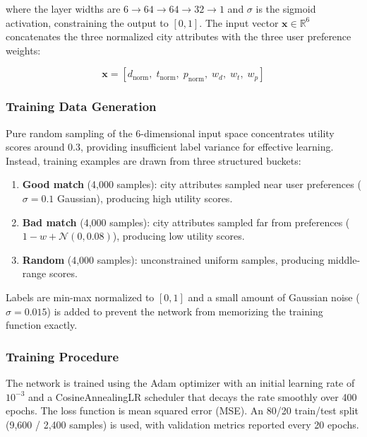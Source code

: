 \documentclass[12pt]{article}
\begin{document}
where the layer widths are $6 \to 64 \to 64 \to 32 \to 1$ and $\sigma$ is the sigmoid activation, constraining the output to $[0, 1]$. The input vector $\mathbf{x} \in \mathbb{R}^6$ concatenates the three normalized city attributes with the three user preference weights:

\begin{equation}
    \mathbf{x} = [d_{\text{norm}},\; t_{\text{norm}},\; p_{\text{norm}},\; w_d,\; w_t,\; w_p]
\end{equation}

\subsubsection{Training Data Generation}

Pure random sampling of the 6-dimensional input space concentrates utility scores around 0.3, providing insufficient label variance for effective learning. Instead, training examples are drawn from three structured buckets:

\begin{enumerate}[(1)]
    \item \textbf{Good match} (4,000 samples): city attributes sampled near user preferences ($\sigma = 0.1$ Gaussian), producing high utility scores.
    \item \textbf{Bad match} (4,000 samples): city attributes sampled far from preferences ($1 - w + \mathcal{N}(0, 0.08)$), producing low utility scores.
    \item \textbf{Random} (4,000 samples): unconstrained uniform samples, producing middle-range scores.
\end{enumerate}

Labels are min-max normalized to $[0, 1]$ and a small amount of Gaussian noise ($\sigma = 0.015$) is added to prevent the network from memorizing the training function exactly.

\subsubsection{Training Procedure}

The network is trained using the Adam optimizer \citep[sec.~2]{kingma2014} with an initial learning rate of $10^{-3}$ and a CosineAnnealingLR scheduler that decays the rate smoothly over 400 epochs. The loss function is mean squared error (MSE). An 80/20 train/test split (9,600 / 2,400 samples) is used, with validation metrics reported every 20 epochs.
\end{document}
